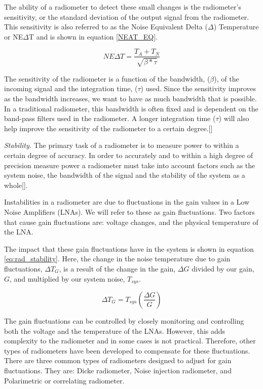 The ability of a radiometer to detect these small changes is the radiometer's sensitivity, or the standard deviation of the output signal from the radiometer.  This sensitivity is also referred to as the Noise Equivalent Delta ($\Delta$) Temperature or NE$\Delta$T and is shown in equation \ref{NEAT_EQ}. 

\begin{equation} \label{NEAT_EQ}
NE\Delta T=\frac{T_{A}+T_{N}}{\sqrt{\beta * \tau}} 
\end{equation}

The sensitivity of the radiometer is a function of the bandwidth, ($\beta$), of the incoming signal and the integration time, ($\tau$) used.  Since the sensitivity improves as the bandwidth increases, we want to have as much bandwidth that is possible.  In a traditional radiometer, this bandwidth is often fixed and is dependent on the band-pass filters used in the radiometer.  A longer integration time ($\tau$) will also help improve the sensitivity of the radiometer to a certain degree.[\cite{ulaby}]

\emph{Stability.}  The primary task of a radiometer is to measure power to within a certain degree of accuracy.  In order to accurately and to within a high degree of precision measure power a radiometer must take into account factors such as the system noise, the bandwidth of the signal and the stability of the system as a whole[\cite{Evans}]. 

Instabilities in a radiometer are due to fluctuations in the gain values in a Low Noise Amplifiers (LNAs). We will refer to these as gain fluctuations.  Two factors that cause gain fluctuations are: voltage changes, and the physical temperature of the LNA.  

The impact that these gain fluctuations have in the system is shown in equation \ref{eq:rad_stability}.  Here, the change in the noise temperature due to gain fluctuations, $\Delta T_{G}$, is a result of the change in the gain, $\Delta G$ divided by our gain, $G$, and multiplied by our system noise, $T_{sys}$.  

\begin{equation} \label{eq:rad_stability}
\Delta T_G=T_{sys} \left(\frac{\Delta G}{G}\right)
\end{equation}

The gain fluctuations can be controlled by closely monitoring and controlling both the voltage and the temperature of the LNAs. However, this adds complexity to the radiometer and in some cases is not practical.  Therefore, other types of radiometers have been developed to compensate for these fluctuations.  There are three common types of radiometers designed to adjust for gain fluctuations.  They are: Dicke radiometer, Noise injection radiometer, and Polarimetric or correlating radiometer.

